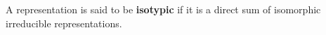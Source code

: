 A representation is said to be \textbf{isotypic} if it is a direct sum of isomorphic irreducible representations.
